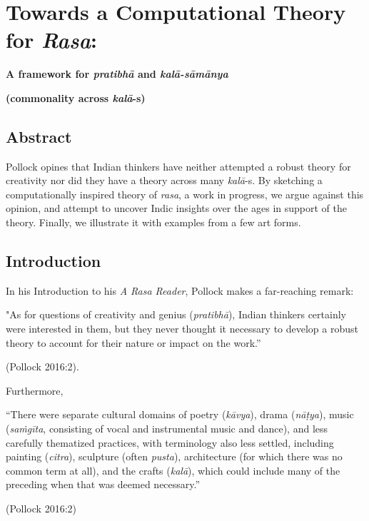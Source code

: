 \chapter[Towards a Computational Theory for \textsl{Rasa}:]{Towards a Computational Theory for \textsl{Rasa}:}\label{chapter\thechapter:begin}

\begin{center}
{\bf A framework for \textsl{pratibhā} and \textsl{kalā-sāmānya} }

{\bf (commonality across \textsl{kalā}-s)}
\end{center}


\section*{Abstract}

Pollock opines that Indian thinkers have neither attempted a robust theory for creativity nor did they have a theory across many \hbox{\textsl{kalā}-s}. By sketching a computationally inspired theory of \textsl{rasa}, a work in progress, we argue against this opinion, and attempt to uncover Indic insights over the ages in support of the theory. Finally, we illustrate it with examples from a few art forms.

\section{Introduction}\label{chap3-sec1}

In his Introduction to his \textsl{A Rasa Reader}, Pollock makes a far-reaching remark:

\begin{myquote}
"As for questions of creativity and genius (\textsl{pratibhā}), Indian thinkers certainly were interested in them, but they never thought it necessary to develop a robust theory to account for their nature or impact on the work.” 

\hfill (Pollock 2016:2).
\end{myquote}

Furthermore, 

\begin{myquote}
“There were separate cultural domains of poetry (\textsl{kāvya}), drama (\textsl{nāṭya}), music (\textsl{saṁgīta}, consisting of vocal and instrumental music and dance), and less carefully thematized practices, with terminology also less settled, including painting (\textsl{citra}), sculpture (often \textsl{pusta}), architecture (for which there was no common term at all), and the crafts (\textsl{kalā}), which could include many of the preceding when that was deemed necessary.” 

\hfill(Pollock 2016:2)
\end{myquote}

